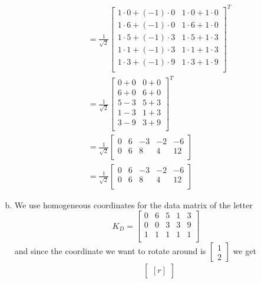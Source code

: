 \documentclass[../main.tex]{subfiles}
\begin{document}
\begin{enumerate}[a)]
\begin{align*}
			\\&=
			\frac{1}{\sqrt{2}}
			\begin{bmatrix}
				1\cdot0 + (-1)\cdot0 & 1\cdot0 + 1\cdot0 \\
				1\cdot6 + (-1)\cdot0 & 1\cdot6 + 1\cdot0 \\
				1\cdot5 + (-1)\cdot3 & 1\cdot5 + 1\cdot3 \\
				1\cdot1 + (-1)\cdot3 & 1\cdot1 + 1\cdot3 \\
				1\cdot3 + (-1)\cdot9 & 1\cdot3 + 1\cdot9 \\
			\end{bmatrix}^T
			\\&=
			\frac{1}{\sqrt{2}}
			\begin{bmatrix}
				0 + 0 & 0 + 0 \\
				6 + 0 & 6 + 0 \\
				5 - 3 & 5 + 3 \\
				1 - 3 & 1 + 3 \\
				3 - 9 & 3 + 9 \\
			\end{bmatrix}^T
			\\&=
			\frac{1}{\sqrt{2}}
			\begin{bmatrix}
				0 & 6 & -3 & -2 & -6 \\
				0 & 6 & 8 & 4 & 12 \\
			\end{bmatrix}
			\\&=
			\frac{1}{\sqrt{2}}
			\begin{bmatrix}
				0 & 6 & -3 & -2 & -6 \\
				0 & 6 & 8 & 4 & 12 \\
			\end{bmatrix}
		\end{align*}
	\item We use homogeneous coordinates for the data matrix of the letter
		\[
			K_D
			=
			\begin{bmatrix}
				0 & 6 & 5 & 1 & 3 \\
				0 & 0 & 3 & 3 & 9 \\
				1 & 1 & 1 & 1 & 1 \\
			\end{bmatrix}
		\]
		and since the coordinate we want to rotate around is \(\begin{bmatrix}1\\2\end{bmatrix}\) we get
		\begin{align*}
			&
			\begin{bmatrix*}[r]

\end{bmatrix*}
\end{align*}
\end{enumerate}
\end{document}
